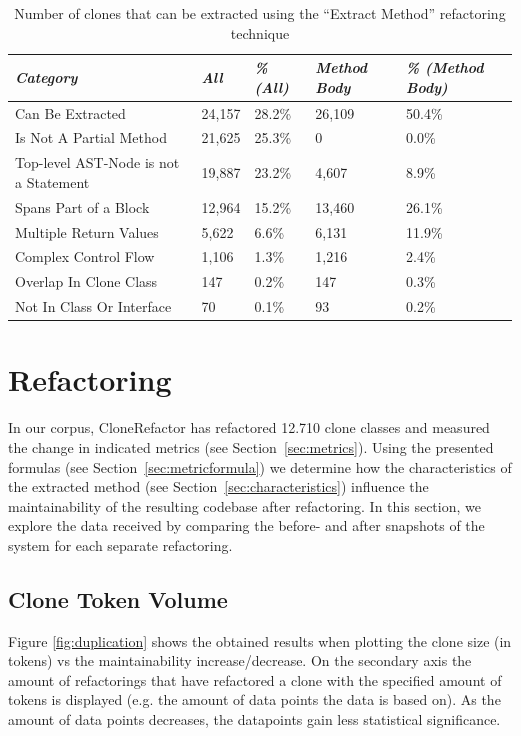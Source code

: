 \begin{table}[H]
\centering
\begin{tabular}{@{}lllll@{}}
\toprule
\textit{\textbf{Category}} & \textit{\textbf{All}} & \textit{\textbf{\% (All)}} & \textit{\textbf{Method Body}} & \textit{\textbf{\% (Method Body)}} \\ \midrule
Can Be Extracted & 24,157 & 28.2\% & 26,109 & 50.4\% \\
Is Not A Partial Method & 21,625 & 25.3\% & 0 & 0.0\% \\
Top-level AST-Node is not a Statement & 19,887 & 23.2\% & 4,607 & 8.9\% \\
Spans Part of a Block & 12,964 & 15.2\% & 13,460 & 26.1\% \\
Multiple Return Values & 5,622 & 6.6\% & 6,131 & 11.9\% \\
Complex Control Flow & 1,106 & 1.3\% & 1,216 & 2.4\% \\
Overlap In Clone Class & 147 & 0.2\% & 147 & 0.3\% \\
Not In Class Or Interface & 70 & 0.1\% & 93 & 0.2\% \\
\bottomrule
\end{tabular}
\caption{Number of clones that can be extracted using the ``Extract Method'' refactoring technique}
\label{tab:refactorability}
\end{table}

\section{Refactoring}
In our corpus, CloneRefactor has refactored 12.710 clone classes and measured the change in indicated metrics (see Section~\ref{sec:metrics}). Using the presented formulas (see Section~\ref{sec:metricformula}) we determine how the characteristics of the extracted method (see Section~\ref{sec:characteristics}) influence the maintainability of the resulting codebase after refactoring. In this section, we explore the data received by comparing the before- and after snapshots of the system for each separate refactoring.

\subsection{Clone Token Volume}
Figure \ref{fig:duplication} shows the obtained results when plotting the clone size (in tokens) vs the maintainability increase/decrease. On the secondary axis the amount of refactorings that have refactored a clone with the specified amount of tokens is displayed (e.g. the amount of data points the data is based on). As the amount of data points decreases, the datapoints gain less statistical significance.

